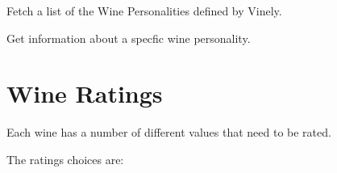 \documentclass[letterpaper,10pt,english]{sphinxmanual}
\begin{document}
Fetch a list of the Wine Personalities defined by Vinely.


\begin{fulllineitems}
\label{personality:get--api-v1-personality-}
\end{fulllineitems}


Get information about a specfic wine personality.


\begin{fulllineitems}
\label{personality:get--api-v1-personality-_id_-}
\end{fulllineitems}



\section{Wine Ratings}
\label{personality:wine-ratings}
Each wine has a number of different values that need to be rated.

The ratings choices are:
\end{document}
